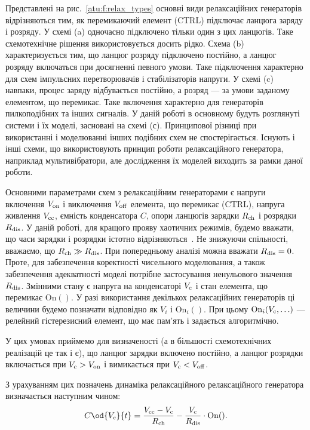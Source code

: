Представлені на рис.~\ref{atu:f:relax_types} основні види релаксаційних
генераторів відрізняються тим, як перемикаючий елемент
(CTRL) підключає ланцюга заряду і розряду. У схемі (a)
одночасно підключено тільки один з цих ланцюгів. Таке
схемотехнічне рішення використовується досить рідко. Схема (b)
характеризується тим, що ланцюг розряду підключено постійно,
а ланцюг розряду включаться при досягненні певного умови. Таке
підключення характерно для схем імпульсних перетворювачів і
стабілізаторів напруги. У схемі (c) навпаки, процес заряду
відбувається постійно, а розряд --- за умови заданому
елементом, що перемикає. Таке включення характерно для
генераторів пилкоподібних та інших сигналів. У даній роботі в
основному будуть розглянуті системи і їх моделі, засновані на
схемі (с). Принципової різниці при використанні і моделюванні
інших подібних схем не спостерігається. Існують і інші схеми,
що використовують принцип роботи релаксаційного генератора,
наприклад мультивібратори, але дослідження їх моделей виходить
за рамки даної роботи.



Основними параметрами схем з релаксаційним генераторами є
напруги включення
$V _\mathrm{on} $ і виключення
$V _\mathrm{off} $ елемента, що перемикає (CTRL), напруга живлення
$V _\mathrm{cc} $, ємність конденсатора
$C $, опори ланцюгів зарядки
$R _\mathrm{ch} $ і розрядки
$R _\mathrm{dis} $. У даній роботі, для кращого прояву хаотичних
режимів, будемо вважати, що часи зарядки і розрядки істотно
відрізняються~\cite{atu_asau19}. Не знижуючи спільності, вважаємо, що
$R _\mathrm{ch} \gg R _\mathrm{dis} $. При попередньому аналізі можна вважати
$R _\mathrm{dis} = 0 $. Проте, для забезпечення коректності чисельного
моделювання, а також забезпечення адекватності моделі потрібне
застосування ненульового значення
$R _\mathrm{dis} $. Змінними стану є напруга на конденсаторі
$V _\mathrm{c} $ і стан елемента, що перемикає
$\mathrm{On}()$. У разі використання декількох релаксаційних
генераторів ці величини будемо позначати відповідно як
$V_{i} $ і
$\mathrm{On}_{i}() $. При цьому
$\mathrm{On}_{i}(V _\mathrm{c}, \ldots) $ --- релейний гістерезисний елемент, що
має пам'ять і задається алгоритмічно.

У цих умовах приймемо для визначеності (а в більшості
схемотехнічних реалізацій це так і є), що ланцюг зарядки включено
постійно, а ланцюг розрядки включається при
$V _\mathrm{c}> V _\mathrm{on} $ і вимикається при
$V _\mathrm{c} <V _\mathrm{off} $.

З урахуванням цих позначень динаміка релаксаційного релаксаційного
генератора визначається наступним чином:
%
\begin{equation}
  C \od{V_c}{t}
  =
  \frac{V\Tidx{cc} - V\Tidx{c}}{R\Tidx{ch}}
  - \frac{V\Tidx{c}}{R\Tidx{dis}} \cdot \mathrm{On}().
  \label{atu:eq:relax0}
\end{equation}

